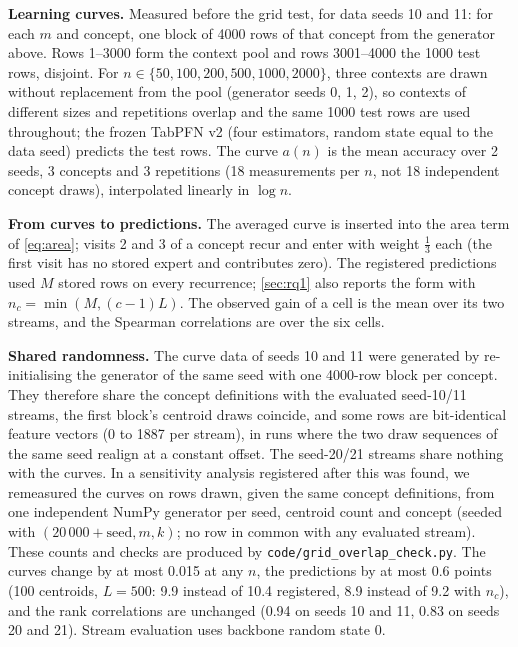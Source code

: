 \documentclass[11pt]{article}
\theoremstyle{plain}
\theoremstyle{definition}
\theoremstyle{remark}
\begin{document}
\textbf{Learning curves.} Measured before the grid test, for data seeds 10 and 11: for each $m$ and concept, one
block of 4000 rows of that concept from the generator above. Rows 1--3000 form the context pool and rows 3001--4000
the 1000 test rows, disjoint. For $n\in\{50,100,200,500,1000,2000\}$, three contexts are drawn without replacement from
the pool (generator seeds 0, 1, 2), so contexts of different sizes and repetitions overlap and the same 1000 test rows
are used throughout; the frozen TabPFN v2 (four estimators, random state equal to the data seed) predicts the test
rows. The curve $a(n)$ is the mean accuracy over 2 seeds, 3 concepts and 3 repetitions (18 measurements per $n$, not
18 independent concept draws), interpolated linearly in $\log n$.

\textbf{From curves to predictions.} The averaged curve is inserted into the area term of \cref{eq:area}; visits 2
and 3 of a concept recur and enter with weight $\tfrac13$ each (the first visit has no stored expert and contributes
zero). The registered predictions used $M$ stored rows on every recurrence; \cref{sec:rq1} also reports the form with
$n_c=\min(M,(c-1)L)$. The observed gain of a cell is the mean over its two streams, and the Spearman correlations are
over the six cells.

\textbf{Shared randomness.} The curve data of seeds 10 and 11 were generated by re-initialising the generator of the
same seed with one 4000-row block per concept. They therefore share the concept definitions with the evaluated
seed-10/11 streams, the first block's centroid draws coincide, and some rows are bit-identical feature vectors (0 to
1887 per stream), in runs where the two draw sequences of the same seed realign at a constant offset.
The seed-20/21 streams share nothing with the curves. In a sensitivity analysis registered after this was found, we
remeasured the curves on rows drawn, given the same concept definitions, from one independent NumPy generator per
seed, centroid count and concept (seeded with $(20\,000+\text{seed},m,k)$; no row in common with any evaluated
stream). These counts and checks are produced by \texttt{code/grid\_overlap\_check.py}. The curves change by at most 0.015 at any $n$, the predictions by at most 0.6
points (100 centroids, $L=500$: 9.9 instead of 10.4 registered, 8.9 instead of 9.2 with $n_c$), and the rank
correlations are unchanged (0.94 on seeds 10 and 11, 0.83 on seeds 20 and 21). Stream evaluation uses backbone random
state 0.
\end{document}
